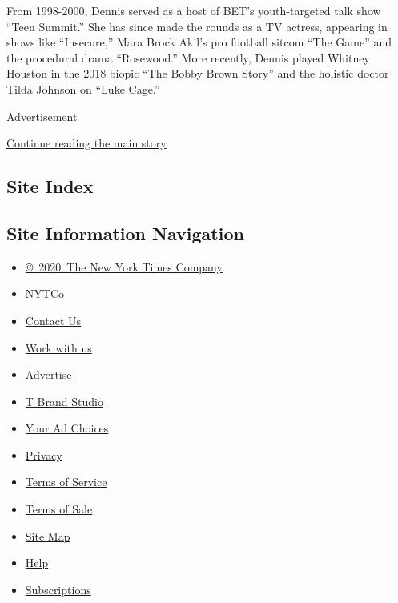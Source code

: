 From 1998-2000, Dennis served as a host of BET's youth-targeted talk
show ``Teen Summit.'' She has since made the rounds as a TV actress,
appearing in shows like ``Insecure,'' Mara Brock Akil's pro football
sitcom ``The Game'' and the procedural drama ``Rosewood.'' More
recently, Dennis played Whitney Houston in the 2018 biopic ``The Bobby
Brown Story'' and the holistic doctor Tilda Johnson on ``Luke Cage.''

Advertisement

\protect\hyperlink{after-bottom}{Continue reading the main story}

\hypertarget{site-index}{%
\subsection{Site Index}\label{site-index}}

\hypertarget{site-information-navigation}{%
\subsection{Site Information
Navigation}\label{site-information-navigation}}

\begin{itemize}
\tightlist
\item
  \href{https://help.nytimes3xbfgragh.onion/hc/en-us/articles/115014792127-Copyright-notice}{©~2020~The
  New York Times Company}
\end{itemize}

\begin{itemize}
\tightlist
\item
  \href{https://www.nytco.com/}{NYTCo}
\item
  \href{https://help.nytimes3xbfgragh.onion/hc/en-us/articles/115015385887-Contact-Us}{Contact
  Us}
\item
  \href{https://www.nytco.com/careers/}{Work with us}
\item
  \href{https://nytmediakit.com/}{Advertise}
\item
  \href{http://www.tbrandstudio.com/}{T Brand Studio}
\item
  \href{https://www.nytimes3xbfgragh.onion/privacy/cookie-policy\#how-do-i-manage-trackers}{Your
  Ad Choices}
\item
  \href{https://www.nytimes3xbfgragh.onion/privacy}{Privacy}
\item
  \href{https://help.nytimes3xbfgragh.onion/hc/en-us/articles/115014893428-Terms-of-service}{Terms
  of Service}
\item
  \href{https://help.nytimes3xbfgragh.onion/hc/en-us/articles/115014893968-Terms-of-sale}{Terms
  of Sale}
\item
  \href{https://spiderbites.nytimes3xbfgragh.onion}{Site Map}
\item
  \href{https://help.nytimes3xbfgragh.onion/hc/en-us}{Help}
\item
  \href{https://www.nytimes3xbfgragh.onion/subscription?campaignId=37WXW}{Subscriptions}
\end{itemize}
